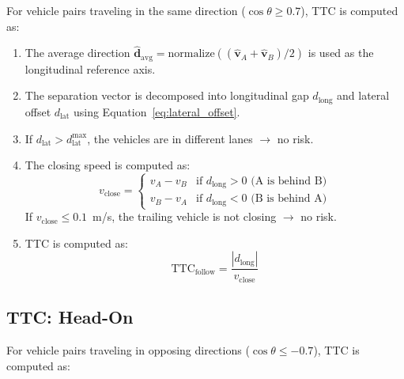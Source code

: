 \documentclass[12pt]{report}
\begin{document}
For vehicle pairs traveling in the same direction ($\cos\theta \geq 0.7$), TTC is computed as:

\begin{enumerate}
    \item The average direction $\hat{\mathbf{d}}_\text{avg} = \text{normalize}((\hat{\mathbf{v}}_A + \hat{\mathbf{v}}_B) / 2)$ is used as the longitudinal reference axis.
    \item The separation vector is decomposed into longitudinal gap $d_\text{long}$ and lateral offset $d_\text{lat}$ using Equation~\eqref{eq:lateral_offset}.
    \item If $d_\text{lat} > d_\text{lat}^\text{max}$, the vehicles are in different lanes $\to$ no risk.
    \item The closing speed is computed as:
    \begin{equation}
        v_\text{close} =
        \begin{cases}
            v_A - v_B & \text{if } d_\text{long} > 0 \text{ (A is behind B)} \\
            v_B - v_A & \text{if } d_\text{long} < 0 \text{ (B is behind A)}
        \end{cases}
        \label{eq:closing_speed_follow}
    \end{equation}
    If $v_\text{close} \leq 0.1$~m/s, the trailing vehicle is not closing $\to$ no risk.
    \item TTC is computed as:
    \begin{equation}
        \text{TTC}_\text{follow} = \frac{|d_\text{long}|}{v_\text{close}}
        \label{eq:ttc_following}
    \end{equation}
\end{enumerate}

\subsection{TTC: Head-On}

For vehicle pairs traveling in opposing directions ($\cos\theta \leq -0.7$), TTC is computed as:
\end{document}
